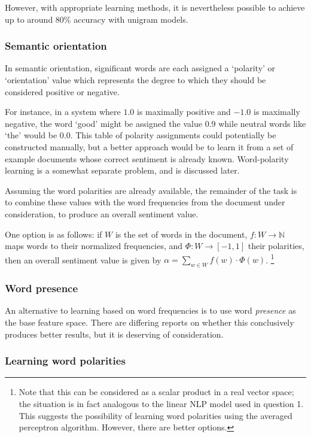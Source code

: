 \documentclass[11pt]{article}
\begin{document}
However, with appropriate learning methods, it is nevertheless possible to
achieve up to around 80\% accuracy with unigram models\cite{Pang2002}.
\subsubsection*{Semantic orientation}

In semantic orientation, significant words are each assigned a `polarity' or
`orientation' value which represents the degree to which they should be
considered positive or negative.

For instance, in a system where $1.0$ is maximally positive and $-1.0$ is
maximally negative, the word `good' might be assigned the value $0.9$ while
neutral words like `the' would be $0.0$. This table of polarity assignments
could potentially be constructed manually, but a better approach would be to
learn it from a set of example documents whose correct sentiment is already
known. Word-polarity learning is a somewhat separate problem, and is discussed
later.

Assuming the word polarities are already available, the remainder of the task
is to combine these values with the word frequencies from the document under
consideration, to produce an overall sentiment value.

One option is as follows: if $W$ is the set of words in the document, $f:W \to
\mathbb{N}$ maps words to their normalized frequencies, and $\Phi:W \to [-1,
1]$ their polarities, then an overall sentiment value is given by $\alpha =
\sum_{w \in W} f(w)\cdot\Phi(w)$.  \footnote{Note that this can be considered
as a scalar product in a real vector space; the situation is in fact analogous
to the linear NLP model used in question 1. This suggests the possibility of
learning word polarities using the averaged perceptron algorithm. However, there are
better options.}

\subsubsection*{Word presence}

An alternative to learning based on word frequencies is to use word
\emph{presence} as the base feature space. There are differing reports on
whether this conclusively produces better results\cite{Pang2002}, but it is
deserving of consideration.

\subsubsection*{Learning word polarities}
\end{document}
